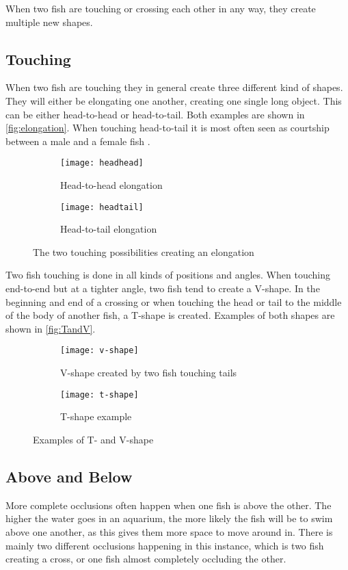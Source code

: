 When two fish are touching or crossing each other in any way, they create multiple new shapes.

\subsection{Touching}
When two fish are touching they in general create three different kind of shapes. They will either be elongating one another, creating one single long object. This can be either head-to-head or head-to-tail. Both examples are shown in \autoref{fig:elongation}. When touching head-to-tail it is most often seen as courtship between a male and a female fish \citep{Kalueff2013}.

\begin{figure}[H]
	\centering
	\begin{subfigure}[b]{0.47\textwidth}
		\texttt{[image: headhead]}
		\caption{Head-to-head elongation}
		\label{fig:headhead}
	\end{subfigure}
	\begin{subfigure}[b]{0.47\textwidth}
		\texttt{[image: headtail]}
		\caption{Head-to-tail elongation}
		\label{fig:headtail}
	\end{subfigure}
\caption{The two touching possibilities creating an elongation}
\label{fig:elongation}
\end{figure}

Two fish touching is done in all kinds of positions and angles. When touching end-to-end but at a tighter angle, two fish tend to create a V-shape. In the beginning and end of a crossing or when touching the head or tail to the middle of the body of another fish, a T-shape is created. Examples of both shapes are shown in \autoref{fig:TandV}.

\begin{figure}[H]
	\centering
	\begin{subfigure}[b]{0.47\textwidth}
		\texttt{[image: v-shape]}
		\caption{V-shape created by two fish touching tails}
		\label{fig:v-shape}
	\end{subfigure}
	\begin{subfigure}[b]{0.47\textwidth}
		\texttt{[image: t-shape]}
		\caption{T-shape example}
		\label{fig:t-shape}
	\end{subfigure}
\caption{Examples of T- and V-shape}
\label{fig:TandV}
\end{figure}

\subsection{Above and Below}
More complete occlusions often happen when one fish is above the other. The higher the water goes in an aquarium, the more likely the fish will be to swim above one another, as this gives them more space to move around in. There is mainly two different occlusions happening in this instance, which is two fish creating a cross, or one fish almost completely occluding the other.


